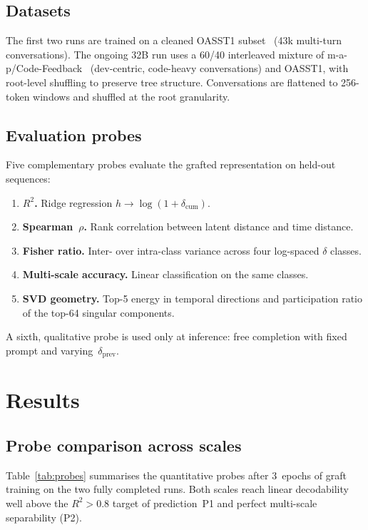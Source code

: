 \documentclass[10pt,twocolumn,letterpaper]{article}
\begin{document}
\subsection{Datasets}

The first two runs are trained on a cleaned OASST1 subset~\cite{kopf2023oasst1} (43k multi-turn conversations). The ongoing 32B run uses a 60/40 interleaved mixture of m-a-p/Code-Feedback~\cite{zheng2024opencodeinterpreter} (dev-centric, code-heavy conversations) and OASST1, with root-level shuffling to preserve tree structure. Conversations are flattened to 256-token windows and shuffled at the root granularity.

\subsection{Evaluation probes}

Five complementary probes evaluate the grafted representation on held-out sequences:
\begin{enumerate}[leftmargin=0.6cm, itemsep=1pt]
    \item \textbf{$R^2$.} Ridge regression $h \to \log(1+\delta_{\text{cum}})$.
    \item \textbf{Spearman~$\rho$.} Rank correlation between latent distance and time distance.
    \item \textbf{Fisher ratio.} Inter- over intra-class variance across four log-spaced $\delta$ classes.
    \item \textbf{Multi-scale accuracy.} Linear classification on the same classes.
    \item \textbf{SVD geometry.} Top-5 energy in temporal directions and participation ratio of the top-64 singular components.
\end{enumerate}

A sixth, qualitative probe is used only at inference: free completion with fixed prompt and varying~$\delta_{\text{prev}}$.

\section{Results}

\subsection{Probe comparison across scales}

Table~\ref{tab:probes} summarises the quantitative probes after 3~epochs of graft training on the two fully completed runs. Both scales reach linear decodability well above the $R^2>0.8$ target of prediction~P1 and perfect multi-scale separability (P2).
\end{document}
